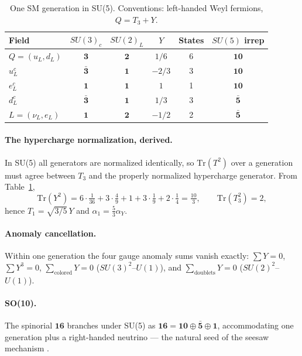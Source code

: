 \documentclass[11pt]{article}
\theoremstyle{remark}
\begin{document}
\begin{table}[ht]
\centering
\begin{tabular}{lccccc}
\toprule
Field & $SU(3)_c$ & $SU(2)_L$ & $Y$ & States & $SU(5)$ irrep\\
\midrule
$Q=(u_L,d_L)$ & $\mathbf{3}$ & $\mathbf{2}$ & $1/6$ & 6 & $\mathbf{10}$\\
$u^c_L$ & $\bar{\mathbf{3}}$ & $\mathbf{1}$ & $-2/3$ & 3 & $\mathbf{10}$\\
$e^c_L$ & $\mathbf{1}$ & $\mathbf{1}$ & $1$ & 1 & $\mathbf{10}$\\
$d^c_L$ & $\bar{\mathbf{3}}$ & $\mathbf{1}$ & $1/3$ & 3 & $\bar{\mathbf{5}}$\\
$L=(\nu_L,e_L)$ & $\mathbf{1}$ & $\mathbf{2}$ & $-1/2$ & 2 & $\bar{\mathbf{5}}$\\
\bottomrule
\end{tabular}
\caption{One SM generation in SU(5). Conventions: left-handed Weyl
fermions, $Q = T_3 + Y$.}
\label{tab:embedding}
\end{table}

\paragraph{The hypercharge normalization, derived.} In SU(5) all
generators are normalized identically, so $\mathrm{Tr}(T^2)$ over a
generation must agree between $T_3$ and the properly normalized
hypercharge generator. From Table~\ref{tab:embedding},
\begin{equation}
\mathrm{Tr}(Y^2) = 6\cdot\tfrac{1}{36} + 3\cdot\tfrac{4}{9} + 1
+ 3\cdot\tfrac{1}{9} + 2\cdot\tfrac{1}{4} = \tfrac{10}{3},
\qquad
\mathrm{Tr}(T_3^2) = 2,
\end{equation}
hence $T_1 = \sqrt{3/5}\,Y$ and $\alpha_1 = \frac{5}{3}\alpha_Y$.

\paragraph{Anomaly cancellation.} Within one generation the four gauge
anomaly sums vanish exactly: $\sum Y = 0$, $\sum Y^3 = 0$,
$\sum_{\mathrm{colored}} Y = 0$ ($SU(3)^2$--$U(1)$), and
$\sum_{\mathrm{doublets}} Y = 0$ ($SU(2)^2$--$U(1)$).

\paragraph{SO(10).} The spinorial $\mathbf{16}$ branches under SU(5) as
$\mathbf{16} = \mathbf{10}\oplus\bar{\mathbf{5}}\oplus\mathbf{1}$,
accommodating one generation plus a right-handed neutrino --- the
natural seed of the seesaw mechanism \cite{fritzsch-minkowski}.
\end{document}
